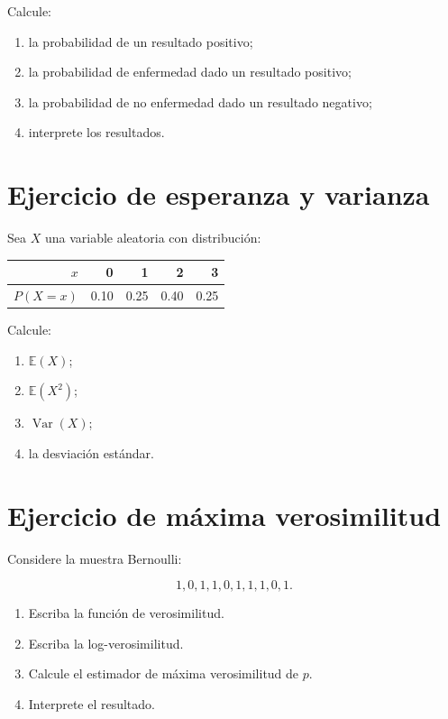 \documentclass[
  spanish,
  11pt,
  letterpaper,
  DIV=11,
  numbers=noendperiod]{scrreprt}
\newcounter{none} %
\providecommand{\tightlist}{%
  \setlength{\itemsep}{0pt}\setlength{\parskip}{0pt}}
\theoremstyle{definition}
\theoremstyle{plain}
\theoremstyle{definition}
\theoremstyle{remark}
\begin{document}
Calcule:

\begin{enumerate}
\def\labelenumi{\arabic{enumi}.}
\tightlist
\item
  la probabilidad de un resultado positivo;
\item
  la probabilidad de enfermedad dado un resultado positivo;
\item
  la probabilidad de no enfermedad dado un resultado negativo;
\item
  interprete los resultados.
\end{enumerate}

\section{Ejercicio de esperanza y
varianza}\label{ejercicio-de-esperanza-y-varianza}

Sea \(X\) una variable aleatoria con distribución:

{\def\LTcaptype{none} %
\begin{longtable}[]{@{}rrrrr@{}}
\toprule\noalign{}
\(x\) & 0 & 1 & 2 & 3 \\
\midrule\noalign{}
\endhead
\bottomrule\noalign{}
\endlastfoot
\(P(X=x)\) & 0.10 & 0.25 & 0.40 & 0.25 \\
\end{longtable}
}

Calcule:

\begin{enumerate}
\def\labelenumi{\arabic{enumi}.}
\tightlist
\item
  \(\mathbb{E}(X)\);
\item
  \(\mathbb{E}(X^2)\);
\item
  \(\operatorname{Var}(X)\);
\item
  la desviación estándar.
\end{enumerate}

\section{Ejercicio de máxima
verosimilitud}\label{ejercicio-de-muxe1xima-verosimilitud}

Considere la muestra Bernoulli:

\[
1,0,1,1,0,1,1,1,0,1.
\]

\begin{enumerate}
\def\labelenumi{\arabic{enumi}.}
\tightlist
\item
  Escriba la función de verosimilitud.
\item
  Escriba la log-verosimilitud.
\item
  Calcule el estimador de máxima verosimilitud de \(p\).
\item
  Interprete el resultado.
\end{enumerate}
\end{document}
